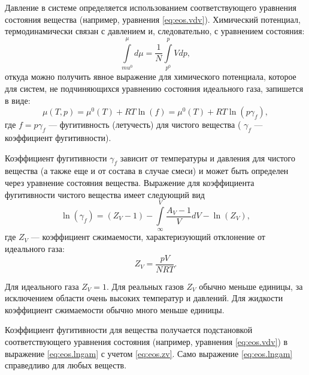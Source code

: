 Давление в системе определяется использованием соответствующего уравнения состояния вещества (например, уравнения \eqref{eq:eos.vdv}). Химический потенциал, термодинамически связан с давлением и, следовательно, с уравнением состояния: 
\begin{equation}
	\int\limits_{mu^0}^{\mu} d \mu = \dfrac{1}{N} \int\limits_{p^0}^{p} V dp,
\end{equation}
откуда можно получить явное выражение для химического потенциала, которое для систем, не подчиняющихся уравнению состояния идеального газа, запишется в виде:
\begin{equation}
	\mu(T,p)=\mu^0(T)+R T \ln (f)=\mu^0 (T) + R T \ln (p \gamma_f),
\end{equation}
где $f=p \gamma_f$ --- фугитивность (летучесть) для чистого вещества ( $\gamma_f$ --- коэффициент фугитивности).

Коэффициент фугитивности $\gamma_f$ зависит от температуры и давления для чистого вещества (а также еще и от состава в случае смеси) и может быть определен через уравнение состояния вещества. Выражение для коэффициента фугитивности чистого вещества имеет следующий вид
\begin{equation}\label{eq:eos.lngam}
	\ln (\gamma_f) = (Z_V -1) - \int\limits_{\infty}^{V} {\dfrac{A_V-1}{V} d V} -\ln(Z_V),
\end{equation}
где $Z_V$ --- коэффициент  сжимаемости, характеризующий отклонение от идеального газа:
\begin{equation} \label{eq:eos.zv}
	Z_V=\dfrac{p V}{N R T}.
\end{equation}

Для идеального газа $Z_V=1$. Для реальных газов $Z_V$ обычно меньше единицы, за исключением области очень высоких температур и давлений. Для жидкости коэффициент сжимаемости обычно много меньше единицы.

Коэффициент фугитивности для вещества получается подстановкой соответствующего уравнения состояния (например, уравнения \eqref{eq:eos.vdv}) в выражение \eqref{eq:eos.lngam} с учетом \eqref{eq:eos.zv}. Само выражение \eqref{eq:eos.lngam} справедливо для любых веществ. 

